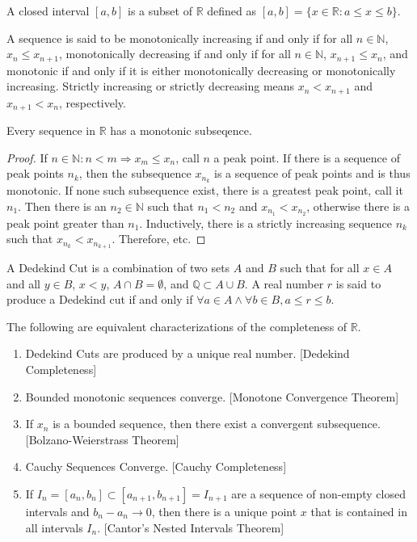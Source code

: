 \documentclass[crop=false,class=article,oneside]{standalone}
\begin{document}
    \begin{definition}
    A closed interval $[a,b]$ is a subset of $\mathbb{R}$ defined as $[a,b] = \{x\in\mathbb{R}:a\leq x\leq b\}$. 
    \end{definition}
    \begin{definition}
    A sequence is said to be monotonically increasing if and only if for all $n\in \mathbb{N}$, $x_n \leq x_{n+1}$, monotonically decreasing if and only if for all $n\in \mathbb{N}$, $x_{n+1} \leq x_{n}$, and monotonic if and only if it is either monotonically decreasing or monotonically increasing. Strictly increasing or strictly decreasing means $x_{n}<x_{n+1}$ and $x_{n+1}<x_n$, respectively.
    \end{definition}
    \begin{theorem}
    Every sequence in $\mathbb{R}$ has a monotonic subseqence.
    \end{theorem}
    \begin{proof}
    If $n\in \mathbb{N}:n<m\Rightarrow x_m \leq x_n$, call $n$ a peak point. If there is a sequence of peak points $n_k$, then the subsequence $x_{n_k}$ is a sequence of peak points and is thus monotonic. If none such subsequence exist, there is a greatest peak point, call it $n_1$. Then there is an $n_2\in \mathbb{N}$ such that $n_1 < n_2$ and $x_{n_1}< x_{n_2}$, otherwise there is a peak point greater than $n_1$. Inductively, there is a strictly increasing sequence $n_k$ such that $x_{n_k}< x_{n_{k+1}}$. Therefore, etc.
    \end{proof}
    \begin{definition}
    A Dedekind Cut is a combination of two sets $A$ and $B$ such that for all $x\in A$ and all $y\in B$, $x< y$, $A\cap B=\emptyset$, and $\mathbb{Q} \subset A\cup B$. A real number $r$ is said to produce a Dedekind cut if and only if $\forall a\in A\land \forall b\in B, a\leq r\leq b$.
    \end{definition}
    \begin{theorem}
    The following are equivalent characterizations of the completeness of $\mathbb{R}$.
    \begin{enumerate}
        \item Dedekind Cuts are produced by a unique real number. \hfill [Dedekind Completeness]
        \item Bounded monotonic sequences converge. \hfill [Monotone Convergence Theorem]
        \item If $x_n$ is a bounded sequence, then there exist a convergent subsequence. \hfill [Bolzano-Weierstrass Theorem]
        \item Cauchy Sequences Converge. \hfill [Cauchy Completeness]
        \item If $I_n = [a_n,b_n]\subset [a_{n+1},b_{n+1}]=I_{n+1}$ are a sequence of non-empty closed intervals and $b_n-a_n \rightarrow 0$, then there is a unique point $x$ that is contained in all intervals $I_n$. \hfill [Cantor's Nested Intervals Theorem]
    \end{enumerate}
    \end{theorem}
\end{document}
